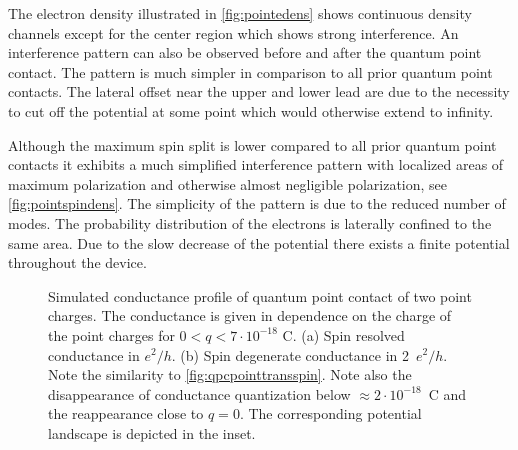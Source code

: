 The electron density illustrated in \cref{fig:pointedens} shows continuous density channels except for the center region which shows strong interference. An interference pattern can also be observed before and after the quantum point contact. The pattern is much simpler in comparison to all prior quantum point contacts. The lateral offset near the upper and lower lead are due to the necessity to cut off the potential at some point which would otherwise extend to infinity.\par
Although the maximum spin split is lower compared to all prior quantum point contacts it exhibits a much simplified interference pattern with localized areas of maximum polarization and otherwise almost negligible polarization, see \cref{fig:pointspindens}. The simplicity of the pattern is due to the reduced number of modes. The probability distribution of the electrons is laterally confined to the same area. Due to the slow decrease of the potential there exists a finite potential throughout the device.\par
\begin{figure}[h]
  \centering
  \caption{Simulated conductance profile of quantum point contact of two point charges. The conductance is given in dependence on the charge of the point charges for $0 < q <7\cdot 10^{-18}$ C. (a) Spin resolved conductance in $e^2/h$. (b) Spin degenerate conductance in 2~$e^2/h$. Note the similarity to \cref{fig:qpcpointtransspin}. Note also the disappearance of conductance quantization below $\approx 2\cdot10^{-18}$~C and the reappearance close to $q=0$. The corresponding potential landscape is depicted in the inset.}
\end{figure}
